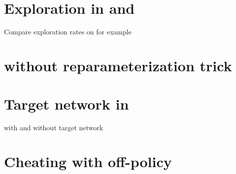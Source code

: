 \section{Exploration in \tdt and \sac}

Compare exploration rates on  for example

\section{\sac without reparameterization trick}

\section{Target network in \dqn}

\dqn with and without target network

\section{Cheating with off-policy \ppo}